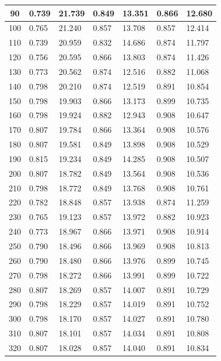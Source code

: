 \documentclass{report}
\begin{document}
\begin{longtable}{|c|l|l|l|l|l|l|}
        90 & 0.739 & 21.739 & 0.849 & 13.351 & 0.866 & 12.680 \\ \hline
        100 & 0.765 & 21.240 & 0.857 & 13.708 & 0.857 & 12.414 \\ \hline
        110 & 0.739 & 20.959 & 0.832 & 14.686 & 0.874 & 11.797 \\ \hline
        120 & 0.756 & 20.595 & 0.866 & 13.803 & 0.874 & 11.426 \\ \hline
        130 & 0.773 & 20.562 & 0.874 & 12.516 & 0.882 & 11.068 \\ \hline
        140 & 0.798 & 20.210 & 0.874 & 12.519 & 0.891 & 10.854 \\ \hline
        150 & 0.798 & 19.903 & 0.866 & 13.173 & 0.899 & 10.735 \\ \hline
        160 & 0.798 & 19.924 & 0.882 & 12.943 & 0.908 & 10.647 \\ \hline
        170 & 0.807 & 19.784 & 0.866 & 13.364 & 0.908 & 10.576 \\ \hline
        180 & 0.807 & 19.581 & 0.849 & 13.898 & 0.908 & 10.529 \\ \hline
        190 & 0.815 & 19.234 & 0.849 & 14.285 & 0.908 & 10.507 \\ \hline
        200 & 0.807 & 18.782 & 0.849 & 13.564 & 0.908 & 10.536 \\ \hline
        210 & 0.798 & 18.772 & 0.849 & 13.768 & 0.908 & 10.761 \\ \hline
        220 & 0.782 & 18.848 & 0.857 & 13.938 & 0.874 & 11.259 \\ \hline
        230 & 0.765 & 19.123 & 0.857 & 13.972 & 0.882 & 10.923 \\ \hline
        240 & 0.773 & 18.967 & 0.866 & 13.971 & 0.908 & 10.914 \\ \hline
        250 & 0.790 & 18.496 & 0.866 & 13.969 & 0.908 & 10.813 \\ \hline
        260 & 0.790 & 18.480 & 0.866 & 13.976 & 0.899 & 10.745 \\ \hline
        270 & 0.798 & 18.272 & 0.866 & 13.991 & 0.899 & 10.722 \\ \hline
        280 & 0.807 & 18.269 & 0.857 & 14.007 & 0.891 & 10.729 \\ \hline
        290 & 0.798 & 18.229 & 0.857 & 14.019 & 0.891 & 10.752 \\ \hline
        300 & 0.798 & 18.170 & 0.857 & 14.027 & 0.891 & 10.780 \\ \hline
        310 & 0.807 & 18.101 & 0.857 & 14.034 & 0.891 & 10.808 \\ \hline
        320 & 0.807 & 18.028 & 0.857 & 14.040 & 0.891 & 10.834 \\ \hline

\end{longtable}
\end{document}
